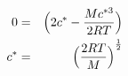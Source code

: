 \begin{eqnarray*}
0 &=& 
    \Bigl( 
        2c^{\ast} - \frac{Mc^{\ast 3}}{2RT} 
    \Bigr) \\
c^{\ast} &=& 
    {
        \Bigl( 
            \frac{2RT}{M}
        \Bigr) 
    }^{\frac{1}{2}}
\label{}
\end{eqnarray*}
